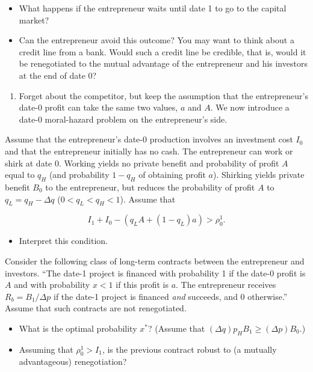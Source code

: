 \documentclass[11pt,a4paper]{article}
\providecommand{\tightlist}{\setlength{\itemsep}{0pt}\setlength{\parskip}{0pt}}
\begin{document}
\begin{itemize}
\tightlist
\item
  What happens if the entrepreneur waits until date 1 to go to the capital market?
\item
  Can the entrepreneur avoid this outcome? You may want to think about a credit line from a bank.
  Would such a credit line be credible, that is, would it be renegotiated to the mutual advantage of
  the entrepreneur and his investors at the end of date 0?
\end{itemize}

\begin{enumerate}
\def\labelenumi{(\roman{enumi})}
\setcounter{enumi}{2}
\tightlist
\item
  Forget about the competitor, but keep the assumption that the entrepreneur's date-0 profit can
  take the same two values, \(a\) and \(A\). We now introduce a date-0 moral-hazard problem on the
  entrepreneur's side.
\end{enumerate}

Assume that the entrepreneur's date-0 production involves an investment cost \(I_0\) and that the
entrepreneur initially has no cash. The entrepreneur can work or shirk at date 0. Working yields no
private benefit and probability of profit \(A\) equal to \(q_H\) (and probability \(1-q_H\) of
obtaining profit \(a\)). Shirking yields private benefit \(B_0\) to the entrepreneur, but reduces
the probability of profit \(A\) to \(q_L = q_H - \Delta q\) (\(0 < q_L < q_H < 1\)). Assume that

\[I_1 + I_0 - (q_LA + (1-q_L)a) > \rho_0^1.\]

\begin{itemize}
\tightlist
\item
  Interpret this condition.
\end{itemize}

Consider the following class of long-term contracts between the entrepreneur and investors. ``The
date-1 project is financed with probability 1 if the date-0 profit is \(A\) and with probability
\(x < 1\) if this profit is \(a\). The entrepreneur receives \(R_b = B_1/\Delta p\) if the date-1
project is financed \emph{and} succeeds, and 0 otherwise.'' Assume that such contracts are not
renegotiated.

\begin{itemize}
\tightlist
\item
  What is the optimal probability \(x^*\)? (Assume that
  \((\Delta q)p_HB_1 \geqslant (\Delta p)B_0\).)
\item
  Assuming that \(\rho_0^1 > I_1\), is the previous contract robust to (a mutually advantageous)
  renegotiation?
\end{itemize}
\end{document}
